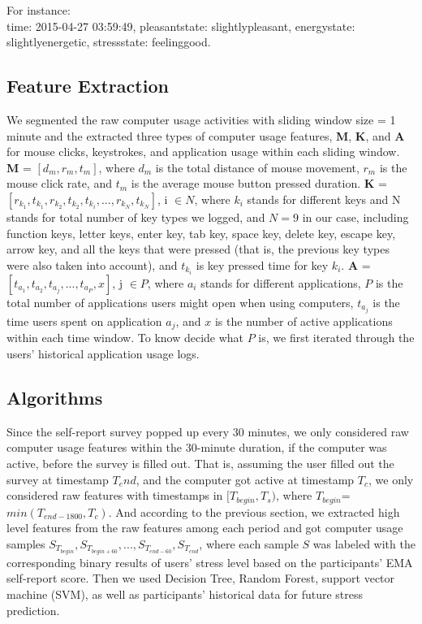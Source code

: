 \documentclass{article}
\begin{document}
For instance: \\
time: 2015-04-27 03:59:49, pleasant\textunderscore state: slightly\textunderscore pleasant, energy\textunderscore state: slightly\textunderscore energetic, stress\textunderscore state: feeling\textunderscore good.


\subsection{Feature Extraction}
We segmented the raw computer usage activities with sliding window size = 1 minute and the extracted three types of computer usage features, \textbf{M}, \textbf{K}, and \textbf{A} for mouse clicks, keystrokes, and application usage within each sliding window. \textbf{M} = $[d_{m}, r_{m}, t_{m}]$, where $d_{m}$ is the total distance of mouse movement, $r_{m}$ is the mouse click rate, and $t_{m}$ is the average mouse button pressed duration. \textbf{K} = $[r_{k_1}, t_{k_1}, r_{k_2}, t_{k_2}, t_{k_i}, ..., r_{k_N}, t_{k_N}]$, i $\in{N}$, where $k_{i}$ stands for different keys and N stands for total number of key types we logged, and $N=9$ in our case, including function keys, letter keys, enter key, tab key, space key, delete key, escape key, arrow key, and all the keys that were pressed (that is, the previous key types were also taken into account), and $t_{k_i}$ is key pressed time for key $k_{i}$.  \textbf{A} = $[t_{a_1}, t_{a_2}, t_{a_j}, ..., t_{a_P}, x]$, j $\in{P}$, where $a_{i}$ stands for different applications, $P$ is the total number of applications users might open when using computers, $t_{a_j}$ is the time users spent on application $a_{j}$, and $x$ is the number of active applications within each time window. To know decide what $P$ is, we first iterated through the users' historical application usage logs.

\subsection{Algorithms}
Since the self-report survey popped up every 30 minutes, we only considered raw computer usage features within the 30-minute duration, if the computer was active,  before the survey is filled out. That is, assuming the user filled out the survey at timestamp $T_end$, and the computer got active at timestamp $T_c$, we only considered raw features with timestamps in $[T_{begin}, T_s)$, where $T_{begin}$=$min(T_{end-1800}, T_c)$. And according to the previous section, we extracted high level features from the raw features among each period and got computer usage samples $S_{T_{begin}}, S_{T_{begin+60}}, ..., S_{T_{end-60}}, S_{T_{end}}$, where each sample $S$ was labeled with the corresponding binary results of users' stress level based on the participants' EMA self-report score. Then we used Decision Tree, Random Forest, support vector machine (SVM), as well as participants' historical data for future stress prediction.
\end{document}
